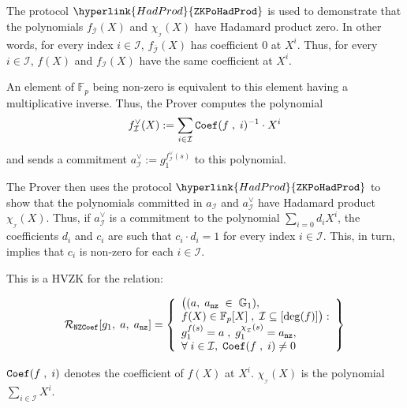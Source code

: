 \documentclass[11pt, lettersize, notitlepage, leqno, footskip=0.6cm]{article}
\newcommand{\bFp}{\mathbb{F}_p}
\newcommand{\mc}{\mathcal}
\newcommand{\mb}{\mathbb}
\newcommand{\ov}{\overline}
\newcommand{\sub}{\subseteq}
\newcommand{\vs}{\vspace{-0.15cm}}
\newcommand{\noin}{\noindent}
\numberwithin{equation}{section}
\begin{document}
The protocol $\hyperlink{HadProd}{\tt{ZKPoHadProd}}$ is used to demonstrate that the polynomials $f_{\ov{\mc{I}}}(X)$ and $\chi_{_\mc{I}}(X)$ have Hadamard product zero. In other words, for every index $i\in \mc{I}$, $f_{\ov{\mc{I}}}(X)$ has coefficient $0$ at $X^i$. Thus, for every $i\in \mc{I}$, $f(X)$ and $f_{{\mc{I}}}(X)$ have the same coefficient at $X^i.$

An element of $\bFp$ being non-zero is equivalent to this element having a multiplicative inverse. Thus, the Prover computes the polynomial \vs $$f_\mc{I}^{\vee}(X):=\sum\limits_{i\in \mc{I}} {\tt{Coef}}(f\;,\;i)^{-1} \cdot X^{i}   \vs  $$ and sends a commitment $a_\mc{I}^{\vee}:= g_1^{f_\mc{I}^{\vee}(s)}$ to this polynomial.

The Prover then uses the protocol $\hyperlink{HadProd}{\tt{ZKPoHadProd}}$ to show that the polynomials committed in $a_\mc{I}$ and $a_\mc{I}^{\vee}$ have Hadamard product $\chi_{_\mc{I}}(X)$. Thus, if $a_\mc{I}^{\vee}$ is a commitment to the polynomial $\sum_{i=0} d_i X^i$, the coefficients $d_i$ and $c_i$ are such that $c_i\cdot d_i = 1$ for every index $i\in \mc{I}$. This, in turn, implies that $c_i$ is non-zero for each $i\in \mc{I}$.




This is a HVZK for the relation: \vspace{-2mm}

$$\mc{R}_{\tt{NZCoef}}[g_1,\;a,\;a_{\tt{nz}}] = \left\{\begin{array}{l} \big((a,\;a_{\tt{nz}}\;\in\;\mb{G}_1),\\
f(X)\in \bFp[X]\;,\; \mc{I}\sub [ \deg(f)]\big):\\
g_1^{f(s)} = a\;,\;g_1^{\chi_{_\mc{I}}(s)} =a_{\tt{nz}},\\
\forall\;i\in \mc{I},\; {\tt{Coef}}(f\;,\; i)\neq 0 \end{array}\right\}  $$

\noin ${\tt{Coef}}(f\;,\; i)$ denotes the coefficient of $f(X)$ at $X^i$. $\chi_{_\mc{I}}(X)$ is the polynomial $\sum\limits_{i\in \mc{I}} X^i$.
 







\vspace{2mm}
\end{document}
